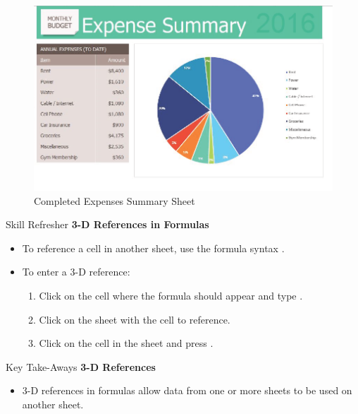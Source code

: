 \begin{figure}[H]
	\centering
	\includegraphics[width=\maxwidth{.95\linewidth}]{gfx/ch06_fig08}
	\caption{Completed Expenses Summary Sheet}
	\label{06:fig08}
\end{figure}

\begin{center}
	\begin{sklbox}{Skill Refresher}
		\textbf{3-D References in Formulas}
		\\
		\begin{itemize}
			\setlength{\itemsep}{0pt}
			\setlength{\parskip}{0pt}
			\setlength{\parsep}{0pt}
			
			\item To reference a cell in another sheet, use the formula syntax .
			\bigskip
			\item To enter a 3-D reference:

			\begin{enumerate}
				\item Click on the cell where the formula should appear and type \fmtTyping{=}.
				\item Click on the sheet with the cell to reference.
				\item Click on the cell in the sheet and press .
			\end{enumerate}
			
		\end{itemize}
	\end{sklbox}
\end{center}

\begin{center}
	\begin{tkwbox}{Key Take-Aways}
		\textbf{3-D References}
		\\
		\begin{itemize}
			\setlength{\itemsep}{0pt}
			\setlength{\parskip}{0pt}
			\setlength{\parsep}{0pt}
			
			\item 3-D references in formulas allow data from one or more sheets to be used on another sheet.
			
		\end{itemize}
	\end{tkwbox}
\end{center}

